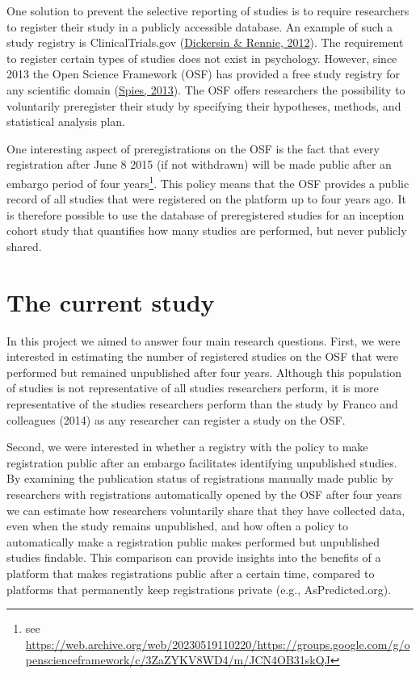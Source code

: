 \documentclass[
  ,jou, a4paper,floatsintext]{apa6}
\begin{document}
One solution to prevent the selective reporting of studies is to require researchers to register their study in a publicly accessible database. An example of such a study registry is ClinicalTrials.gov (\protect\hyperlink{ref-dickersin_evolution_2012}{Dickersin \& Rennie, 2012}). The requirement to register certain types of studies does not exist in psychology. However, since 2013 the Open Science Framework (OSF) has provided a free study registry for any scientific domain (\protect\hyperlink{ref-spies_open_2013}{Spies, 2013}). The OSF offers researchers the possibility to voluntarily preregister their study by specifying their hypotheses, methods, and statistical analysis plan.

One interesting aspect of preregistrations on the OSF is the fact that every registration after June 8 2015 (if not withdrawn) will be made public after an embargo period of four years\footnote{see \url{https://web.archive.org/web/20230519110220/https://groups.google.com/g/openscienceframework/c/3ZaZYKV8WD4/m/JCN4OB31skQJ}}. This policy means that the OSF provides a public record of all studies that were registered on the platform up to four years ago. It is therefore possible to use the database of preregistered studies for an inception cohort study that quantifies how many studies are performed, but never publicly shared.

\hypertarget{the-current-study}{%
\section{The current study}\label{the-current-study}}

In this project we aimed to answer four main research questions. First, we were interested in estimating the number of registered studies on the OSF that were performed but remained unpublished after four years. Although this population of studies is not representative of all studies researchers perform, it is more representative of the studies researchers perform than the study by Franco and colleagues (2014) as any researcher can register a study on the OSF.

Second, we were interested in whether a registry with the policy to make registration public after an embargo facilitates identifying unpublished studies. By examining the publication status of registrations manually made public by researchers with registrations automatically opened by the OSF after four years we can estimate how researchers voluntarily share that they have collected data, even when the study remains unpublished, and how often a policy to automatically make a registration public makes performed but unpublished studies findable. This comparison can provide insights into the benefits of a platform that makes registrations public after a certain time, compared to platforms that permanently keep registrations private (e.g., AsPredicted.org).
\end{document}
